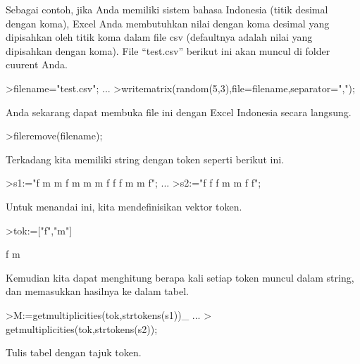 \documentclass[a4paper,10pt]{article}
\begin{document}
\begin{eulernotebook}
\begin{eulercomment}
\begin{eulercomment}
\begin{eulercomment}
\begin{eulercomment}
\begin{eulercomment}
\begin{eulercomment}
\begin{eulercomment}
\begin{eulercomment}
\begin{eulercomment}
\begin{eulercomment}
\begin{eulercomment}
\begin{eulercomment}
\begin{eulercomment}
\begin{eulercomment}
\begin{eulercomment}
\begin{eulercomment}
\begin{eulercomment}
\begin{eulercomment}
\begin{eulercomment}
\begin{eulercomment}
\begin{eulercomment}
\begin{eulercomment}
\begin{eulercomment}
\begin{eulercomment}
\begin{eulercomment}
Sebagai contoh, jika Anda memiliki sistem bahasa Indonesia (titik
desimal dengan koma), Excel Anda membutuhkan nilai dengan koma desimal
yang dipisahkan oleh titik koma dalam file csv (defaultnya adalah
nilai yang dipisahkan dengan koma). File “test.csv” berikut ini akan
muncul di folder cuurent Anda.
\end{eulercomment}
\begin{eulerprompt}
>filename="test.csv"; ...
>writematrix(random(5,3),file=filename,separator=",");
\end{eulerprompt}
\begin{eulercomment}
Anda sekarang dapat membuka file ini dengan Excel Indonesia secara
langsung.
\end{eulercomment}
\begin{eulerprompt}
>fileremove(filename);
\end{eulerprompt}
\begin{eulercomment}
Terkadang kita memiliki string dengan token seperti berikut ini.
\end{eulercomment}
\begin{eulerprompt}
>s1:="f m m f m m m f f f m m f";  ...
>s2:="f f f m m f f";
\end{eulerprompt}
\begin{eulercomment}
Untuk menandai ini, kita mendefinisikan vektor token.
\end{eulercomment}
\begin{eulerprompt}
>tok:=["f","m"]
\end{eulerprompt}
\begin{euleroutput}
  f
  m
\end{euleroutput}
\begin{eulercomment}
Kemudian kita dapat menghitung berapa kali setiap token muncul dalam
string, dan memasukkan hasilnya ke dalam tabel.
\end{eulercomment}
\begin{eulerprompt}
>M:=getmultiplicities(tok,strtokens(s1))_ ...
>  getmultiplicities(tok,strtokens(s2));
\end{eulerprompt}
\begin{eulercomment}
Tulis tabel dengan tajuk token.
\end{eulercomment}
\begin{eulerprompt}

\end{eulerprompt}
\end{eulercomment}
\end{eulercomment}
\end{eulercomment}
\end{eulercomment}
\end{eulercomment}
\end{eulercomment}
\end{eulercomment}
\end{eulercomment}
\end{eulercomment}
\end{eulercomment}
\end{eulercomment}
\end{eulercomment}
\end{eulercomment}
\end{eulercomment}
\end{eulercomment}
\end{eulercomment}
\end{eulercomment}
\end{eulercomment}
\end{eulercomment}
\end{eulercomment}
\end{eulercomment}
\end{eulercomment}
\end{eulercomment}
\end{eulercomment}
\end{eulernotebook}
\end{document}
